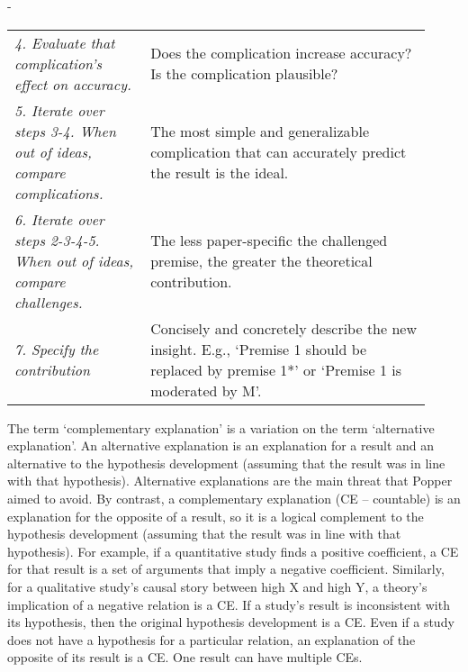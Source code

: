 \documentclass[twocolumn, 10pt]{article}
\newlength{\fullwidthlen}
\newenvironment{fullwidth}{%
  \begin{adjustwidth}{-\fullwidthlen}{}%
}{%
  \end{adjustwidth}%
}
\begin{document}
\begin{table}[t!]
\begin{fullwidth}
\begin{tabularx}{\columnwidth}{@{}>{\RaggedRight\arraybackslash}p{0.3\linewidth} >{\RaggedRight\arraybackslash}p{0.62\linewidth}@{}}
      \emph{4. Evaluate that complication's effect on accuracy.}                   & Does the complication increase accuracy? Is the complication plausible?                                                                                                                                                                                                                           \\
      \emph{5. Iterate over steps 3-4. When out of ideas, compare complications.}  & The most  simple and generalizable  complication that can  accurately  predict the result is the ideal.                                                                                                                                                                                           \\
      \emph{6. Iterate over steps 2-3-4-5. When out of ideas, compare challenges.} & The  less paper-specific the challenged premise, the greater the theoretical contribution.                                                                                                                                                                                                        \\
      \emph{7. Specify the contribution}                                           & Concisely and concretely describe the new insight.  \newline E.g., ‘Premise 1 should be replaced by premise 1*' or ‘Premise 1 is moderated by M'.                                                                                                                                                 \\
    \end{tabularx}
  \end{fullwidth}
\end{table}
The term ‘complementary explanation' is a variation on the term ‘alternative explanation'. An alternative explanation is an explanation for a result and an alternative to the hypothesis development (assuming that the result was in line with that hypothesis). Alternative explanations are the main threat that Popper aimed to avoid. By contrast, a complementary explanation (CE -- countable) is an explanation for the opposite of a result, so it is a logical complement to the hypothesis development (assuming that the result was in line with that hypothesis). For example, if a quantitative study finds a positive coefficient, a CE for that result is a set of arguments that imply a negative coefficient. Similarly, for a qualitative study's causal story between high X and high Y, a theory's implication of a negative relation is a CE. If a study's result is inconsistent with its hypothesis, then the original hypothesis development is a CE. Even if a study does not have a hypothesis for a particular relation, an explanation of the opposite of its result is a CE. One result can have multiple CEs.
\end{document}
